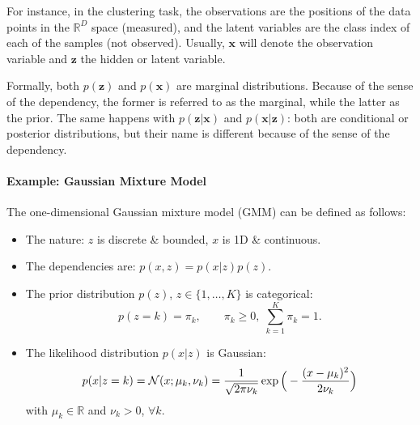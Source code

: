 For instance, in the clustering task, the observations are the positions of the data points in the $\mathbb{R}^D$ space (measured), and the latent variables are the class index of each of the samples (not observed). Usually, $\mathbf{x}$ will denote the observation variable and $\mathbf{z}$ the hidden or latent variable.\vspace{2mm}
   

Formally, both $p(\mathbf{z})$ and $p(\mathbf{x})$ are marginal distributions. Because of the sense of the dependency, the former is referred to as the marginal, while the latter as the prior. The same happens with $p(\mathbf{z}|\mathbf{x})$ and $p(\mathbf{x}|\mathbf{z})$: both are conditional or posterior distributions, but their name is different because of the sense of the dependency.

\paragraph{Example: Gaussian Mixture Model} The one-dimensional Gaussian mixture model (GMM) can be defined as follows:
\begin{itemize}
\item The nature: $z$ is discrete \& bounded, $x$ is 1D \& continuous.
\item The dependencies are: $p(x,z)=p(x|z)p(z)$.
\item The prior distribution $p(z)$, $z\in\{1,\ldots,K\}$ is categorical:
\begin{equation}p(z=k) = \pi_k, \qquad \pi_k\geq 0,\; \sum_{k=1}^K \pi_k = 1.\end{equation}
\item The likelihood distribution $p(x|z)$ is Gaussian:
\begin{equation}p(x|z=k) = {\cal N}(x;\mu_k,\nu_k) = \frac{1}{\sqrt{2\pi\nu_k}}\exp\Big(-\frac{(x-\mu_k)^2}{2\nu_k}\Big)\end{equation}
with $\mu_k\in\mathbb{R}$ and $\nu_k>0$, $\forall k$.
\end{itemize}

